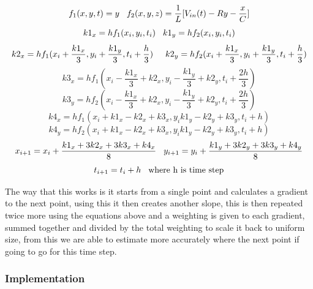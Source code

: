\documentclass[11pt,a4paper]{article}
\begin{document}
\begin{equation}
f_1(x,y,t) = y \hspace{3mm} f_2(x,y,z) = \frac{1}{L}[V_{in}(t) - Ry - \frac{x}{C}]
\end{equation}
\begin{equation}
	k1_x = hf_1(x_i,y_i,t_i) \hspace{3mm} k1_y = hf_2(x_i,y_i,t_i)
\end{equation}
\begin{equation}
	k2_x = hf_1(x_i+\frac{k1_x}{3},y_i+\frac{k1_y}{3},t_i+\frac{h}{3}) \hspace{5mm} k2_y = hf_2(x_i+\frac{k1_x}{3},y_i+\frac{k1_y}{3},t_i+\frac{h}{3})
\end{equation}
\begin{equation}
	k3_x = hf_1(x_i-\frac{k1_x}{3}+k2_x,y_i-\frac{k1_y}{3}+k2_y,t_i+\frac{2h}{3})
\end{equation}
\begin{equation}
	k3_y = hf_2(x_i-\frac{k1_x}{3}+k2_x,y_i-\frac{k1_y}{3}+k2_y,t_i+\frac{2h}{3})
\end{equation}
\begin{equation}
	k4_x = hf_1(x_i+k1_x-k2_x+k3_x,y_ik1_y-k2_y+k3_y,t_i+h)
\end{equation}
\begin{equation}
	k4_y = hf_2(x_i+k1_x-k2_x+k3_x,y_ik1_y-k2_y+k3_y,t_i+h)
\end{equation}
\begin{equation}
	x_{i+1} =x_i+\frac{k1_x+3k2_x+3k3_x+k4_x}{8} \hspace{3mm} y_{i+1} =y_i+\frac{k1_y+3k2_y+3k3_y+k4_y}{8}
\end{equation}
\begin{equation}
	t_{i+1} = t_i + h \hspace{3mm} \text{where h is time step}
\end{equation}

The way that this works is it starts from a single point and calculates a gradient to the next point, using this it then creates another slope, this is then repeated twice more using the equations above and a weighting is given to each gradient, summed together and divided by the total weighting to scale it back to uniform size, from this we are able to estimate more accurately where the next point if going to go for this time step.

\subsubsection{Implementation}
\end{document}
